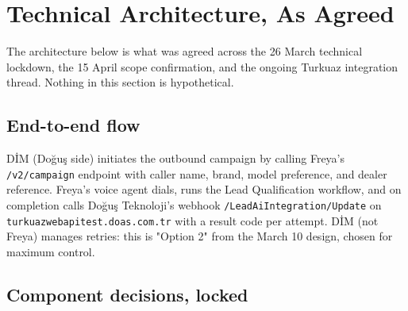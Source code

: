 \documentclass[10pt,a4paper]{article}
\begin{document}
\newpage

\section{Technical Architecture, As Agreed}

The architecture below is what was agreed across the 26 March technical lockdown, the 15 April scope confirmation, and the ongoing Turkuaz integration thread. Nothing in this section is hypothetical.

\subsection{End-to-end flow}

DİM (Doğuş side) initiates the outbound campaign by calling Freya's \texttt{/v2/campaign} endpoint with caller name, brand, model preference, and dealer reference. Freya's voice agent dials, runs the Lead Qualification workflow, and on completion calls Doğuş Teknoloji's webhook \texttt{/LeadAiIntegration/Update} on \texttt{turkuazwebapitest.doas.com.tr} with a result code per attempt. DİM (not Freya) manages retries: this is "Option 2" from the March 10 design, chosen for maximum control.

\subsection{Component decisions, locked}
\end{document}
